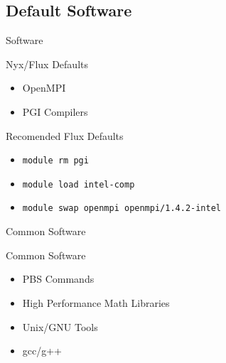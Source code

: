 \documentclass[handout]{beamer}
\begin{document}
  \subsection {Default Software}
  \begin{frame}{Software}
    \begin{block}{Nyx/Flux Defaults}
    \begin{itemize}
      \item OpenMPI
      \item PGI Compilers
    \end{itemize}
    \end{block}
    \begin{block}{Recomended Flux Defaults}
     \begin{itemize}
      \item \texttt{module rm pgi}
      \item \texttt{module load intel-comp}
      \item \texttt{module swap openmpi openmpi/1.4.2-intel}
     \end{itemize}
    \end{block}
  \end{frame}

  \begin{frame}{Common Software}
   \begin{block}{Common Software}
    \begin{itemize}
     \item PBS Commands
     \item High Performance Math Libraries
     \item Unix/GNU Tools
     \item gcc/g++
    \end{itemize}
   \end{block}
  \end{frame}
\end{document}
